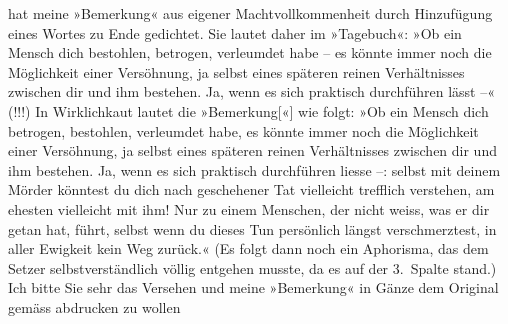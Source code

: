\begin{ledgroupsized}[t]{13cm}
                    hat meine »Bemerkung« aus eigener Machtvollkommenheit durch Hinzufügung eines
                    Wortes zu Ende gedichtet. Sie lautet daher im »Tagebuch«: »Ob ein Mensch dich bestohlen, betrogen, verleumdet habe –
                    es könnte immer noch die Möglichkeit einer Versöhnung, ja selbst eines späteren
                    reinen Verhältnisses zwischen dir und ihm bestehen. Ja, wenn es sich praktisch
                    durchführen lässt –« (!!!)\pend
           \pstart
           In Wirklichkaut lautet die »Bemerkung{[}«{]} wie folgt:\pend
           \pstart
           »Ob ein Mensch dich betrogen, bestohlen, 
                    verleumdet habe, es könnte immer noch die Möglichkeit einer Versöhnung, ja
                    selbst eines späteren reinen Verhältnisses zwischen dir und ihm bestehen. Ja,
                    wenn es sich praktisch durchführen liesse –:
                    selbst mit deinem Mörder könntest du dich nach geschehener Tat vielleicht
                    trefflich verstehen, am ehesten vielleicht mit ihm! Nur {\pb}zu einem Menschen, der nicht weiss, was er dir
                    getan hat, führt, selbst wenn du dieses Tun persönlich längst verschmerztest, in
                    aller Ewigkeit kein Weg zurück.«\pend
           \pstart
           (Es folgt dann noch ein Aphorisma, das dem Setzer selbstverständlich völlig
                    entgehen musste, da es auf der 3. Spalte stand.)\pend
           \pstart
           Ich bitte Sie sehr das Versehen \label{K_L02476_1v}\label{K_L02476_1h} und meine
                        »Bemerkung« in Gänze dem Original gemäss
                    abdrucken zu wollen\pend
           \pstart

\end{ledgroupsized}
